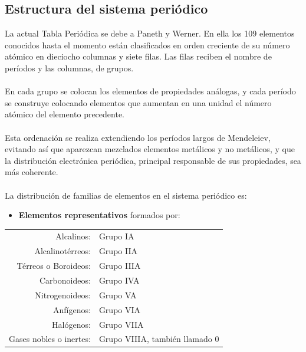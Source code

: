 \documentclass[12pt]{article}
\begin{document}
               \subsection{Estructura del sistema periódico}\label{sec:Estructura del sistema periódico}
                    La actual Tabla Periódica se debe a Paneth y Werner. En ella los 109 elementos conocidos hasta el momento están clasificados en orden creciente de su número atómico en dieciocho columnas y siete filas. Las filas reciben el nombre de períodos y las columnas, de grupos.\\\\
                    En cada grupo se colocan los elementos de propiedades análogas, y cada período se construye colocando elementos que aumentan en una unidad el número atómico del elemento precedente.\\\\
                    Esta ordenación se realiza extendiendo los períodos largos de Mendeleiev, evitando así que aparezcan mezclados elementos metálicos y no metálicos, y que la distribución electrónica periódica, principal responsable de sus propiedades, sea más coherente.\\\\
                    La distribución de familias de elementos en el sistema periódico es:

                    \begin{itemize}
                         \item \textbf{Elementos representativos} formados por:
                    \end{itemize}
                    \begin{flushright}
                         \begin{tabular}{rl}
                              Alcalinos:               & Grupo IA \\
                              Alcalinotérreos:         & Grupo IIA \\
                              Térreos o Boroideos:     & Grupo IIIA \\
                              Carbonoideos:            & Grupo IVA \\
                              Nitrogenoideos:          & Grupo VA \\
                              Anfígenos:               & Grupo VIA \\
                              Halógenos:               & Grupo VIIA \\
                              Gases nobles o inertes:  & Grupo VIIIA, también llamado 0
                         \end{tabular}
                    \end{flushright}
\end{document}
